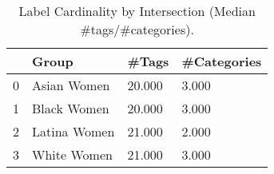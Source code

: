 \begin{table}[htbp]
\centering
\caption{Label Cardinality by Intersection (Median #tags/#categories).}
\label{tab:eda_label_cardinality}
\begin{tabular}{llll}
\toprule
 & Group & \#Tags & \#Categories \\
\midrule
0 & Asian Women & 20.000 & 3.000 \\
1 & Black Women & 20.000 & 3.000 \\
2 & Latina Women & 21.000 & 2.000 \\
3 & White Women & 21.000 & 3.000 \\
\bottomrule
\end{tabular}

\end{table}